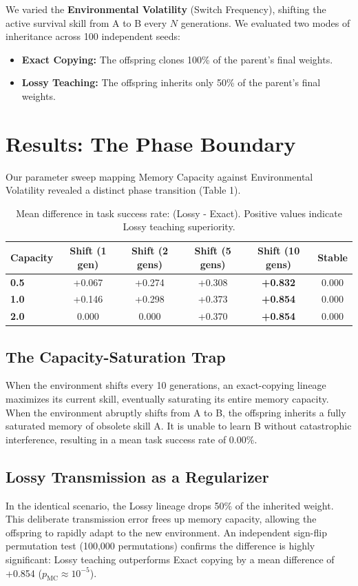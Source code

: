 \documentclass[11pt,a4paper]{article}
\begin{document}
We varied the \textbf{Environmental Volatility} (Switch Frequency), shifting the active survival skill from A to B every $N$ generations. We evaluated two modes of inheritance across 100 independent seeds:
\begin{itemize}
    \item \textbf{Exact Copying:} The offspring clones 100\% of the parent's final weights.
    \item \textbf{Lossy Teaching:} The offspring inherits only 50\% of the parent's final weights.
\end{itemize}

\section{Results: The Phase Boundary}
Our parameter sweep mapping Memory Capacity against Environmental Volatility revealed a distinct phase transition (Table 1).

\begin{table}[h!]
\centering
\begin{tabular}{lccccc}
\toprule
\textbf{Capacity} & \textbf{Shift (1 gen)} & \textbf{Shift (2 gens)} & \textbf{Shift (5 gens)} & \textbf{Shift (10 gens)} & \textbf{Stable} \\
\midrule
\textbf{0.5} & +0.067 & +0.274 & +0.308 & \textbf{+0.832} & 0.000 \\
\textbf{1.0} & +0.146 & +0.298 & +0.373 & \textbf{+0.854} & 0.000 \\
\textbf{2.0} & 0.000  & 0.000  & +0.370 & \textbf{+0.854} & 0.000 \\
\bottomrule
\end{tabular}
\caption{Mean difference in task success rate: (Lossy - Exact). Positive values indicate Lossy teaching superiority.}
\end{table}

\subsection{The Capacity-Saturation Trap}
When the environment shifts every 10 generations, an exact-copying lineage maximizes its current skill, eventually saturating its entire memory capacity. When the environment abruptly shifts from A to B, the offspring inherits a fully saturated memory of obsolete skill A. It is unable to learn B without catastrophic interference, resulting in a mean task success rate of 0.00\%.

\subsection{Lossy Transmission as a Regularizer}
In the identical scenario, the Lossy lineage drops 50\% of the inherited weight. This deliberate transmission error frees up memory capacity, allowing the offspring to rapidly adapt to the new environment. An independent sign-flip permutation test (100,000 permutations) confirms the difference is highly significant: Lossy teaching outperforms Exact copying by a mean difference of +0.854 ($p_{\mathrm{MC}} \approx 10^{-5}$).
\end{document}
